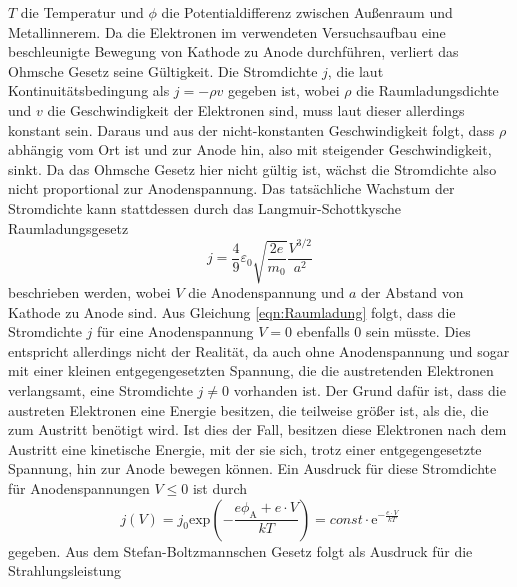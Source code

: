 $T$ die Temperatur und $\phi$ die Potentialdifferenz zwischen Außenraum und Metallinnerem.
\newline\newline
Da die Elektronen im verwendeten Versuchsaufbau eine beschleunigte Bewegung von Kathode zu Anode durchführen, verliert das Ohmsche Gesetz seine Gültigkeit. Die Stromdichte $j$,
die laut Kontinuitätsbedingung als $j = - \rho v$ gegeben ist, wobei $\rho$ die Raumladungsdichte und $v$ die Geschwindigkeit der Elektronen sind, muss laut dieser allerdings
konstant sein. Daraus und aus der nicht-konstanten Geschwindigkeit folgt, dass $\rho$ abhängig vom Ort ist und zur Anode hin, also mit steigender Geschwindigkeit, sinkt.
\newline
Da das Ohmsche Gesetz hier nicht gültig ist, wächst die Stromdichte also nicht proportional zur Anodenspannung. Das tatsächliche Wachstum der Stromdichte kann stattdessen
durch das Langmuir-Schottkysche Raumladungsgesetz 
\begin{equation}
    j = \frac{4}{9}\varepsilon_0 \sqrt{\frac{2e}{m_0}}\frac{V^{3/2}}{a^2}
    \label{eqn:Raumladung}
\end{equation}
beschrieben werden, wobei $V$ die Anodenspannung und $a$ der Abstand von Kathode zu Anode sind.
\newline\newline
Aus Gleichung \eqref{eqn:Raumladung} folgt, dass die Stromdichte $j$ für eine Anodenspannung $V = 0$ ebenfalls 0 sein müsste. Dies entspricht allerdings nicht der Realität,
da auch ohne Anodenspannung und sogar mit einer kleinen entgegengesetzten Spannung, die die austretenden Elektronen verlangsamt, eine Stromdichte $j \neq 0$ vorhanden ist.
Der Grund dafür ist, dass die austreten Elektronen eine Energie besitzen, die teilweise größer ist, als die, die zum Austritt benötigt wird. Ist dies der Fall, besitzen diese
Elektronen nach dem Austritt eine kinetische Energie, mit der sie sich, trotz einer entgegengesetzte Spannung, hin zur Anode bewegen können. Ein Ausdruck für diese
Stromdichte für Anodenspannungen $V \leq 0$ ist durch
\begin{equation}
    j(V) = j_0 \mathrm{exp}\left(-\frac{e\phi_\text{A} + e \cdot V}{kT} \right) = const \cdot \mathrm{e}^{-\frac{e \cdot V}{kT}}
    \label{eqn:j_Anlauf}
\end{equation}
gegeben.
\newline\newline
\label{subsec:Temperatur_Kathode}
Aus dem Stefan-Boltzmannschen Gesetz folgt als Ausdruck für die Strahlungsleistung
